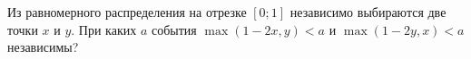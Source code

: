 \documentclass{article}
\begin{document}
Из равномерного распределения на отрезке $[0;1]$ независимо выбираются две точки $x$ и $y$.
При каких $a$ события $\max(1-2x,y) < a$ и $\max(1-2y,x) < a$ независимы?
\end{document}
